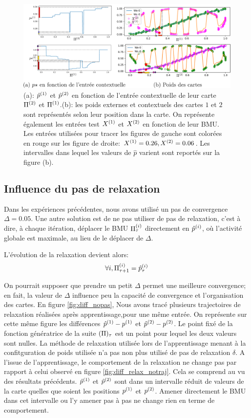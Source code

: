 \documentclass[../main]{subfiles}
\begin{document}
\begin{figure}
	\includegraphics[width=\textwidth]{am_w_006}
	\caption{(a): $\hat{p}^{({1})}$ et $\hat{p}^{({2})}$ en fonction de l'entrée contextuelle de leur carte $\Pi^{({2})}$ et $\Pi^{({1})}$.(b): les poids externes et contextuels des cartes $1$ et $2$ sont représentés selon leur position dans la carte. On représente également les entrées test $X^{({1})}$ et $X^{({2})}$ en fonction de leur BMU. Les entrées utilisées pour tracer les figures de gauche sont colorées en rouge sur les figure de droite: $X^{({1})}=0.26,X^{({2})}=0.06$. Les intervalles dans lequel les valeurs de $\hat{p}$ varient sont reportés sur la figure (b).}
	\label{fig:w006}
	\end{figure}

\subsection{Influence du pas de relaxation}

Dans les expériences précédentes, nous avons utilisé un pas de convergence $\Delta=0.05$.
Une autre solution est de ne pas utiliser de pas de relaxation, c'est à dire, à chaque itération, déplacer le BMU $\Pi^{({i})}_\tau$ directement en $\hat{p}^{({i})}$, où l'activité globale est maximale, au lieu de le déplacer de $\Delta$.

L'évolution de la relaxation devient alors:
\begin{equation}
\forall i, \Pi^{({i})}_{\tau+1} = \hat{p}^{({i})}_{\tau}
\end{equation}

On pourrait supposer que prendre un petit $\Delta$ permet une meilleure convergence; en fait, la valeur de $\Delta$ influence peu la capacité de convergence et l'organisation des cartes.
En figure \ref{fig:diff_nopas}, Nous avons tracé plusieurs trajectoires de relaxation réalisées après apprentissage,pour une même entrée. 
On représente sur cette même figure les différences ${\hat{p}}^{({1})} - p^{({1})}$ et ${\hat{p}}^{({2})} - p^{({2})}$. Le point fixé de la fonction génératrice de la suite $(\Pi)_\tau$ est un point pour lequel les deux valeurs sont nulles.
La méthode de relaxation utilisée lors de l'apprentissage menant à la confitguration de poids utilisée n'a pas non plus utilisé de pas de relaxation $\delta$.
A l'issue de l'apprentissage, le comportement de la relaxation ne change pas par rapport à celui observé en figure \ref{fig:diff_relax_notraj}.
Cela se comprend au vu des résultats précédents. $\hat{p}^{({1})}$ et $\hat{p}^{({2})}$ sont dans un intervalle réduit de valeurs de la carte quelles que soient les positions $p^{({1})}$ et $p^{({2})}$. 
Amener directement le BMU dans cet intervalle ou l'y amener pas à pas ne change rien en terme de comportement. 
\end{document}
